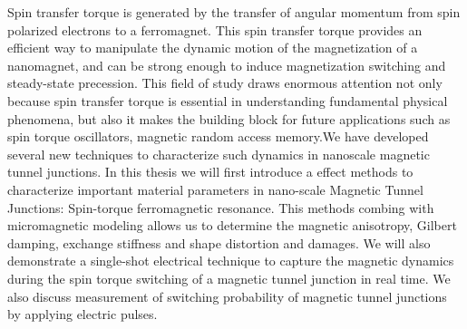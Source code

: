 \thesisabstract
{
 	Spin transfer torque is generated by the transfer of angular momentum from spin polarized electrons to a ferromagnet. This spin transfer torque provides an efficient way to manipulate the dynamic motion of the magnetization of a nanomagnet, and can be strong enough to induce magnetization switching and steady-state precession. This field of study draws enormous attention not only because spin transfer torque is essential in understanding fundamental physical phenomena, but also it makes the building block for future applications such as spin torque oscillators, magnetic random access memory.We have developed several new techniques to characterize such dynamics in nanoscale magnetic tunnel junctions. In this thesis we will first introduce a effect methods to characterize important material parameters in nano-scale Magnetic Tunnel Junctions: Spin-torque ferromagnetic resonance. This methods combing with micromagnetic modeling allows us to determine the magnetic anisotropy, Gilbert damping, exchange stiffness and shape distortion and damages. We will also demonstrate a single-shot electrical technique to capture the magnetic dynamics during the spin torque switching of a magnetic tunnel junction in real time. We also discuss measurement of switching probability of magnetic tunnel junctions by applying electric pulses.
}


